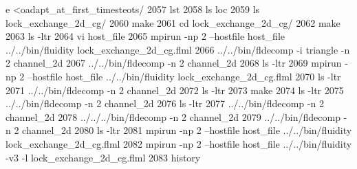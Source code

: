 e
      <oadapt_at_first_timesteots/
 2057  lst
 2058  ls loc
 2059  ls lock_exchange_2d_cg/
 2060  make
 2061  cd lock_exchange_2d_cg/
 2062  make
 2063  ls -ltr
 2064  vi host_file
 2065  mpirun -np 2 --hostfile host_file ../../bin/fluidity lock_exchange_2d_cg.flml 
 2066  ../../bin/fldecomp -i triangle -n 2 channel_2d
 2067  ../../bin/fldecomp -n 2 channel_2d
 2068  ls -ltr
 2069  mpirun -np 2 --hostfile host_file ../../bin/fluidity lock_exchange_2d_cg.flml 
 2070  ls -ltr
 2071  ../../bin/fldecomp -n 2 channel_2d
 2072  ls -ltr
 2073  make
 2074  ls -ltr
 2075  ../../bin/fldecomp -n 2 channel_2d
 2076  ls -ltr
 2077  ../../bin/fldecomp -n 2 channel_2d
 2078  ../../../bin/fldecomp -n 2 channel_2d
 2079  ../../bin/fldecomp -n 2 channel_2d
 2080  ls -ltr
 2081  mpirun -np 2 --hostfile host_file ../../bin/fluidity lock_exchange_2d_cg.flml 
 2082  mpirun -np 2 --hostfile host_file ../../bin/fluidity -v3 -l lock_exchange_2d_cg.flml 
 2083  history

